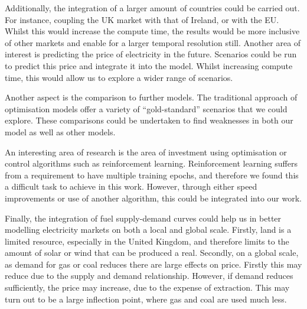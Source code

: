 Additionally, the integration of a larger amount of countries could be carried out. For instance, coupling the UK market with that of Ireland, or with the EU. Whilst this would increase the compute time, the results would be more inclusive of other markets and enable for a larger temporal resolution still. Another area of interest is predicting the price of electricity in the future. Scenarios could be run to predict this price and integrate it into the model. Whilst increasing compute time, this would allow us to explore a wider range of scenarios. 

Another aspect is the comparison to further models. The traditional approach of optimisation models offer a variety of ``gold-standard'' scenarios that we could explore. These comparisons could be undertaken to find weaknesses in both our model as well as other models. 

An interesting area of research is the area of investment using optimisation or control algorithms such as reinforcement learning. Reinforcement learning suffers from a requirement to have multiple training epochs, and therefore we found this a difficult task to achieve in this work. However, through either speed improvements or use of another algorithm, this could be integrated into our work. 

Finally, the integration of fuel supply-demand curves could help us in better modelling electricity markets on both a local and global scale. Firstly, land is a limited resource, especially in the United Kingdom, and therefore limits to the amount of solar or wind that can be produced a real. Secondly, on a global scale, as demand for gas or coal reduces there are large effects on price. Firstly this may reduce due to the supply and demand relationship. However, if demand reduces sufficiently, the price may increase, due to the expense of extraction. This may turn out to be a large inflection point, where gas and coal are used much less. 


